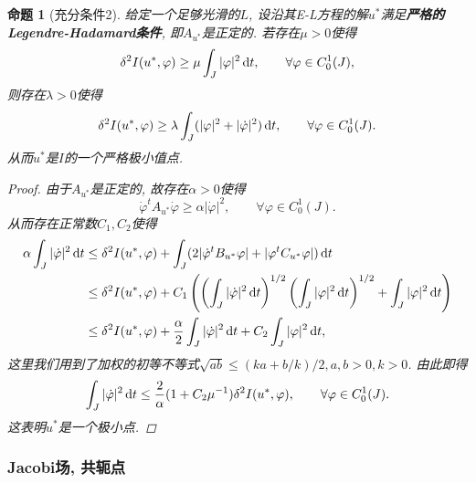 \documentclass[12pt,a4paper]{article}
\newtheorem{proposition}[theorem]{命题}
\begin{document}
\begin{proposition}[充分条件2]\label{prop1.14}
    给定一个足够光滑的$L$, 设沿其E-L方程的解$u^*$满足\textbf{严格的Legendre-Hadamard条件}, 即$A_{u^*}$是正定的.
    若存在$\mu > 0$使得 
    \begin{equation*}
        \delta^2I(u^*, \varphi) \geq \mu\int_J|\varphi|^2 \,{\rm d}t, \qquad \forall \varphi \in C_0^1(J),
    \end{equation*}
    则存在$\lambda > 0$使得
    \begin{equation*}
        \delta^2I(u^*, \varphi) \geq \lambda\int_J(|\varphi|^2+|\dot\varphi|^2) \,{\rm d}t, \qquad \forall \varphi \in C_0^1(J).
    \end{equation*}
    从而$u^*$是$I$的一个严格极小值点.
    \begin{proof}
        由于$A_{u^*}$是正定的, 故存在$\alpha > 0$使得 
        \begin{equation*}
            \dot\varphi^tA_{u^*}\dot\varphi \geq \alpha|\dot\varphi|^2, \qquad \forall \varphi \in C_0^1(J).
        \end{equation*}
        从而存在正常数$C_1, C_2$使得
        \begin{align*} 
            \alpha\int_J|\dot\varphi|^2 \,{\rm d}t &\leq \delta^2I(u^*,\varphi) + \int_J(2| \dot\varphi^tB_{u^*}\varphi| + |\varphi^t C_{u^*}\varphi|) \,{\rm d}t \\ 
            &\leq \delta^2I(u^*,\varphi) + C_1\left(\left(\int_J|\dot\varphi|^2 \,{\rm d}t\right)^{1/2}\left(\int_J|\varphi|^2 \,{\rm d}t\right)^{1/2} + \int_J|\varphi|^2 \,{\rm d}t\right) \\ 
            &\leq \delta^2I(u^*,\varphi) + \frac{\alpha}{2}\int_J|\dot\varphi|^2 \,{\rm d}t + C_2\int_J|\varphi|^2 \,{\rm d}t, 
        \end{align*}
        这里我们用到了加权的初等不等式$\sqrt{ab} \leq (ka + b/k)/2, a, b > 0, k > 0$.
        由此即得 
        \begin{equation*}
            \int_J|\dot\varphi|^2 \,{\rm d}t \leq \frac{2}{\alpha}(1+C_2\mu^{-1})\delta^2I(u^*, \varphi), \qquad \forall \varphi \in C_0^1(J).
        \end{equation*} 
        这表明$u^*$是一个极小点.
    \end{proof}
\end{proposition}

\subsubsection{Jacobi场, 共轭点}
\end{document}
